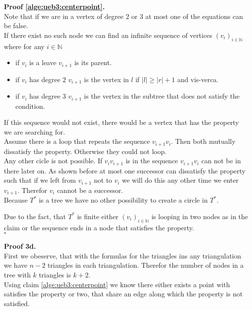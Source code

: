 \documentclass[11pt,a4paper,ngerman]{article}
\begin{document}
\textbf{Proof \ref{alge:ueb3:centerpoint}.}\\
Note that if we are in a vertex of degree $2$ or $3$ at most one of the equations can be false.\\

If there exist no such node we can find an infinite sequence of vertices $(v_i)_{i\in \mathbb{N}}$
where for any $i \in \mathbb{N}$
\begin{itemize}
    \item if $v_i$ is a leave $v_{i+1}$ is its parent.
    \item if $v_i$ has degree $2$ $v_{i+1}$ is the vertex in $l$ if $|l| \geq |r| + 1$ and vis-verca.
    \item if $v_i$ has degree $3$ $v_{i+1}$ is the vertex in the subtree that does not satisfy the condition.
\end{itemize}
If this sequence would not exist, there would be a vertex that has the property we are searching for.\\

Assume there is a loop that repeats the sequence $v_{i+1}v_i$. Then both mutually dissatisfy the property.
Otherwise they could not loop.\\

Any other cicle is not possible. If $v_{i}v_{i+1}$ is in the sequence $v_{i+1}v_i$ can not be in there later on.
As shown before at most one successor can dissatisfy the property such that if we left from $v_{i+1}$ not to $v_i$ we
will do this any other time we enter $v_{i+1}$. Therefor $v_i$ cannot be a successor.\\

Because $T^*$ is a tree we have no other possibility to create a circle in $T^*$.

Due to the fact, that $T^*$ is finite either $(v_i)_{i \in \mathbb{N}}$ is looping in two nodes as in the claim
or the sequence ends in a node that satisfies the property.\\
\mbox{}\hfill $\square$

\textbf{Proof 3d.}\\
First we obeserve, that with the formulas for the triangles ins any triangulation we have $n-2$ triangles in
each triangulation. Therefor the number of nodes in a tree with $k$ triangles is $k+2$.\\

Using claim \ref{alge:ueb3:centerpoint} we know there either exists a point with satisfies the property or two,
that share an edge along which the property is not satisfied.\\
\end{document}
